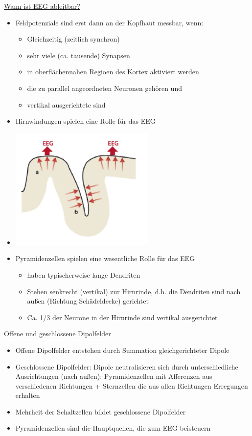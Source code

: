 \documentclass[a4paper,10pt,oneside]{article}
\begin{document}
\underline{Wann ist EEG ableitbar?} \\
	\begin{itemize}
		\item Feldpotenziale sind erst dann an der Kopfhaut messbar, wenn:	
			\begin{itemize}
				\item Gleichzeitig (zeitlich synchron)
				\item sehr viele (ca. tausende) Synapsen
				\item in oberflächennahen Regioen des Kortex aktiviert werden
				\item die zu parallel angeordneten Neuronen gehören und 
				\item vertikal ausgerichtete sind
			\end{itemize}
		\item Hirnwindungen spielen eine Rolle für das EEG
		\item[] \includegraphics[scale=0.25]{Grafiken/1913.png}
		\item Pyramidenzellen spielen eine wesentliche Rolle für das EEG
			\begin{itemize}
				\item haben typischerweise lange Dendriten
				\item Stehen senkrecht (vertikal) zur Hirnrinde, d.h. die Dendriten sind nach außen (Richtung Schädeldecke) gerichtet
				\item Ca. 1/3 der Neurone in der Hirnrinde sind vertikal ausgerichtet
			\end{itemize}
	\end{itemize}

\underline{Offene und geschlossene Dipolfelder} \\
	\begin{itemize}
		\item Offene Dipolfelder entstehen durch Summation gleichgerichteter Dipole
		\item Geschlossene Dipolfelder: Dipole neutralisieren sich durch unterschiedliche Ausrichtungen (nach außen): Pyramidenzellen mit Afferenzen aus verschiedenen Richtungen + Sternzellen die aus allen Richtungen Erregungen erhalten
		\item Mehrheit der Schaltzellen bildet geschlossene Dipolfelder
		\item Pyramidenzellen sind die Hauptquellen, die zum EEG beisteuern
	\end{itemize}
	
\end{document}
